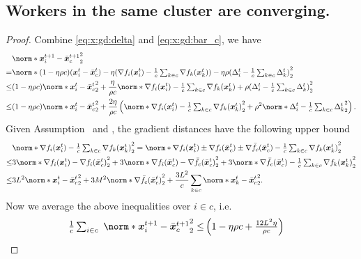 \documentclass{article}
\begin{document}
\subsection{Workers in the same cluster are converging.}
\begin{proof}
  Combine \eqref{eq:x:gd:delta} and \eqref{eq:x:gd:bar_c}, we have
  \begin{align*}
    &\norm*{\xx_i^{t+1} - \bar{\xx}_c^{t+1}}_2^2 \\
    =& \norm*{
      (1-\eta\rho c)(\xx_i^{t} - \bar{\xx}_c^{t})
      - \eta ( \nabla f_i(\xx_i^t) - \tfrac{1}{c} \tsum_{k\in c}\nabla f_k(\xx_k^t) )
      -\eta\rho(\Delta_i^t - \tfrac{1}{c}\tsum_{k\in c} \Delta_k^t )
    }_2^2 \\
    \le& (1-\eta\rho c) \norm*{\xx_i^{t} - \bar{\xx}_c^{t}}_2^2
    + \frac{\eta}{\rho c} \norm*{\nabla f_i(\xx_i^t) - \tfrac{1}{c} \tsum_{k\in c}\nabla f_k(\xx_k^t)
    + \rho(\Delta_i^t - \tfrac{1}{c}\tsum_{k\in c} \Delta_k^t )}_2^2 \\
    \le& (1-\eta\rho c) \norm*{\xx_i^{t} - \bar{\xx}_c^{t}}_2^2
    + \frac{2\eta}{\rho c} \left(
      \norm*{\nabla f_i(\xx_i^t) - \tfrac{1}{c} \tsum_{k\in c}\nabla f_k(\xx_k^t)}_2^2
      + \rho^2 \norm*{\Delta_i^t - \tfrac{1}{c}\tsum_{k\in c} \Delta_k^t }_2^2
    \right).
  \end{align*}
  Given Assumption~ and , the gradient distances have the following upper bound
  \begin{align*}
    &\norm*{\nabla f_i(\xx_i^t) - \tfrac{1}{c} \tsum_{k\in c}\nabla f_k(\xx_k^t)}_2^2
    = \norm*{\nabla f_i(\xx_i^t) \pm \nabla f_i(\bar{\xx}_c^t) \pm \nabla \bar{f}_c(\bar{\xx}_c^t) - \tfrac{1}{c} \tsum_{k\in c}\nabla f_k(\xx_k^t)}_2^2 \\
    \le& 3 \norm*{\nabla f_i(\xx_i^t) - \nabla f_i(\bar{\xx}_c^t)}_2^2
    + 3 \norm*{\nabla f_i(\bar{\xx}_c^t) - \nabla \bar{f}_c(\bar{\xx}_c^t)}_2^2
    + 3 \norm*{ \nabla \bar{f}_c(\bar{\xx}_c^t) - \tfrac{1}{c} \tsum_{k\in c}\nabla f_k(\xx_k^t)}_2^2 \\
    \le& 3 L^2 \norm*{\xx_i^t - \bar{\xx}_c^t}_2^2 + 3M^2 \norm*{\nabla \bar{f}_c(\bar{\xx}_c^t)}_2^2 + \frac{3L^2}{c}\sum_{k\in c} \norm*{\xx_k^t - \bar{\xx}_c^t}_2^2.
  \end{align*}
  Now we average the above inequalities over $i\in c$, i.e.
  \begin{align*}
    \tfrac{1}{c}\tsum_{i\in c}\ \norm*{\xx_i^{t+1} - \bar{\xx}_c^{t+1}}_2^2
    \le& 
    \left(1-\eta\rho c + \tfrac{12L^2\eta}{\rho c} \right)

\end{align*}
\end{proof}
\end{document}

